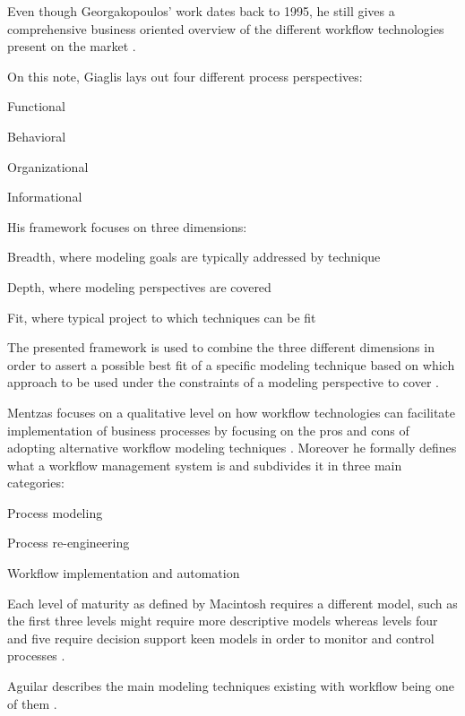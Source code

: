 \documentclass{seal_thesis}
\begin{document}
Even though Georgakopoulos' work dates back to 1995, he still gives a comprehensive business oriented overview of the different workflow technologies present on the market \cite{Georgakopoulos1995}.

On this note, Giaglis lays out four different process perspectives:
\begin{enumerate*}
	\item Functional
	\item Behavioral
	\item Organizational
	\item Informational
\end{enumerate*}

His framework focuses on three dimensions:
\begin{enumerate*}
	\item Breadth, where modeling goals are typically addressed by technique
	\item Depth, where modeling perspectives are covered
	\item Fit, where typical project to which techniques can be fit
\end{enumerate*}

The presented framework is used to combine the three different dimensions in order to assert a possible best fit of a specific modeling technique based on which approach to be used under the constraints of a modeling perspective to cover \cite{Giaglis2001}.

Mentzas focuses on a qualitative level on how workflow technologies can facilitate implementation of business processes by focusing on the pros and cons of adopting alternative workflow modeling techniques \cite{Mentzas2001}. Moreover he formally defines what a workflow management system is and subdivides it in three main categories:
\begin{enumerate*}
	\item Process modeling
	\item Process re-engineering
	\item Workflow implementation and automation
\end{enumerate*}

Each level of maturity as defined by Macintosh requires a different model, such as the first three levels might require more descriptive models whereas levels four and five require decision support keen models in order to monitor and control processes \cite{Mentzas2001}.

Aguilar describes the main modeling techniques existing with workflow being one of them \cite{Aguilar-Saven2004}.
\end{document}
